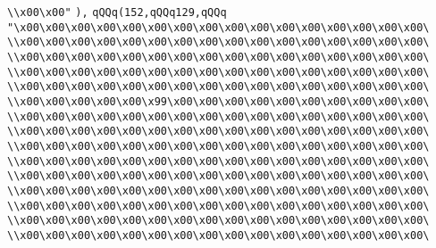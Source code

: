 \verb|\\x00\x00"|\newline
\verb|),|\newline
\verb|qQQq(152,qQQq129,qQQq|\newline
\verb|"\x00\x00\x00\x00\x00\x00\x00\x00\x00\x00\x00\x00\x00\x00\x00\x00\|\newline
\verb|\\x00\x00\x00\x00\x00\x00\x00\x00\x00\x00\x00\x00\x00\x00\x00\x00\|\newline
\verb|\\x00\x00\x00\x00\x00\x00\x00\x00\x00\x00\x00\x00\x00\x00\x00\x00\|\newline
\verb|\\x00\x00\x00\x00\x00\x00\x00\x00\x00\x00\x00\x00\x00\x00\x00\x00\|\newline
\verb|\\x00\x00\x00\x00\x00\x00\x00\x00\x00\x00\x00\x00\x00\x00\x00\x00\|\newline
\verb|\\x00\x00\x00\x00\x00\x99\x00\x00\x00\x00\x00\x00\x00\x00\x00\x00\|\newline
\verb|\\x00\x00\x00\x00\x00\x00\x00\x00\x00\x00\x00\x00\x00\x00\x00\x00\|\newline
\verb|\\x00\x00\x00\x00\x00\x00\x00\x00\x00\x00\x00\x00\x00\x00\x00\x00\|\newline
\verb|\\x00\x00\x00\x00\x00\x00\x00\x00\x00\x00\x00\x00\x00\x00\x00\x00\|\newline
\verb|\\x00\x00\x00\x00\x00\x00\x00\x00\x00\x00\x00\x00\x00\x00\x00\x00\|\newline
\verb|\\x00\x00\x00\x00\x00\x00\x00\x00\x00\x00\x00\x00\x00\x00\x00\x00\|\newline
\verb|\\x00\x00\x00\x00\x00\x00\x00\x00\x00\x00\x00\x00\x00\x00\x00\x00\|\newline
\verb|\\x00\x00\x00\x00\x00\x00\x00\x00\x00\x00\x00\x00\x00\x00\x00\x00\|\newline
\verb|\\x00\x00\x00\x00\x00\x00\x00\x00\x00\x00\x00\x00\x00\x00\x00\x00\|\newline
\verb|\\x00\x00\x00\x00\x00\x00\x00\x00\x00\x00\x00\x00\x00\x00\x00\x00\|\newline
